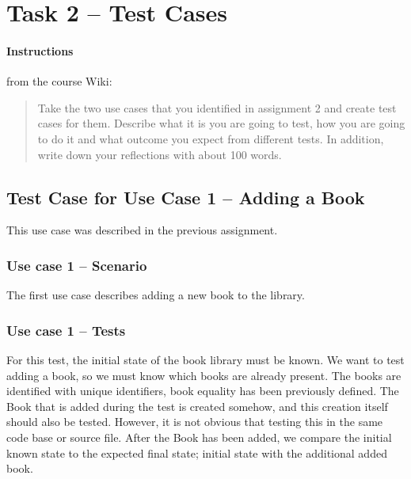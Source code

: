 %
%
%
%


\section{Task 2 -- Test Cases}

\paragraph{Instructions}\label{task-1-instructions}
from the course Wiki\cite{1dv600:lab3:instructions}:

\begin{quote}
    Take the two use cases that you identified in assignment 2 and create test
    cases for them. Describe what it is you are going to test, how you are
    going to do it and what outcome you expect from different tests. In
    addition, write down your reflections with about 100 words.
\end{quote}



\subsection{Test Case for Use Case 1 -- Adding a Book}\label{task-2a}
This use case was described in the previous assignment.

\subsubsection{Use case 1 -- Scenario}\label{task-2a}
The first use case describes adding a new book to the library.


\subsubsection{Use case 1 -- Tests}
For this test, the initial state of the book library must be known. We want
to test adding a book, so we must know which books are already present.
The books are identified with unique identifiers, book equality has been
previously defined.
The Book that is added during the test is created somehow, and this creation
itself should also be tested. However, it is not obvious that testing this in
the same code base or source file.
After the Book has been added, we compare the initial known state to the
expected final state; initial state with the additional added book.

